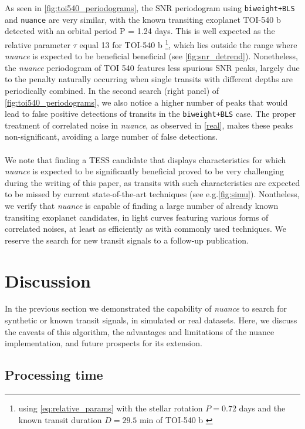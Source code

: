 \documentclass[modern]{aastex631}
\newcommand{\nuancemethod}{\textit{nuance}}
\newcommand{\nuance}{\nuancemethod{}}
\newcommand{\nuancecode}{\textsf{nuance}}
\begin{document}
As seen in \autoref{fig:toi540_periodograms}, the SNR periodogram using \texttt{biweight+BLS} and \texttt{nuance} are very similar, with the known transiting exoplanet TOI-540 b detected with an orbital period P = 1.24 days. This is well expected as the relative parameter $\tau$ equal 13 for TOI-540 b \footnote{using \autoref{eq:relative_params} with the stellar rotation $P=0.72$ days and the known transit duration $D=29.5$ min of TOI-540 b \citep{TOI540}}, which lies outside the range where \nuancemethod{} is expected to be beneficial beneficial (see \autoref{fig:snr_detrend}). Nonetheless, the \nuance{} periodogram of TOI 540 features less spurious SNR peaks, largely due to the penalty naturally occurring when single transits with different depths are periodically combined. In the second search (right panel) of \autoref{fig:toi540_periodograms}, we also notice a higher number of peaks that would lead to false positive detections of transits in the \texttt{biweight+BLS} case. The proper treatment of correlated noise in \nuance{}, as observed in \autoref{real}, makes these peaks non-significant, avoiding a large number of false detections.\\\\
We note that finding a TESS candidate that displays characteristics for which \nuance{} is expected to be significantly beneficial proved to be very challenging during the writing of this paper, as transits with such characteristics are expected to be missed by current state-of-the-art techniques (see e.g.\;\autoref{fig:simu}). Nontheless, we verify that \nuancemethod{} is capable of finding a large number of already known transiting exoplanet candidates, in light curves featuring various forms of correlated noises, at least as efficiently as with commonly used techniques. We reserve the search for new transit signals to a follow-up publication.

\section{Discussion}\label{discussion}

In the previous section we demonstrated the capability of \nuance{} to search for synthetic or known transit signals, in simulated or real datasets. Here, we discuss the caveats of this algorithm, the advantages and limitations of the \nuancecode{} implementation, and future prospects for its extension.

\subsection{Processing time}
\end{document}
